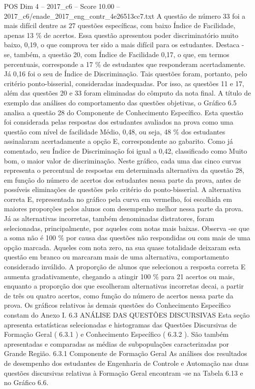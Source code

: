 \begin{textsample}{POS Dim 4 – 2017\_c6 – Score 10.00 – 2017\_c6/enade\_2017\_eng\_contr\_4e26513cc7.txt}
A questão de número 33 foi a mais difícil dentre as 27 questões específicas, com baixo Índice de Facilidade, apenas 13 \% de acertos.
Essa questão apresentou poder discriminatório muito baixo, 0,19, o que comprova ter sido a mais difícil para os estudantes.
Destaca -se, também, a questão 20, com Índice de Facilidade 0,17, o que, em termos percentuais, corresponde a 17 \% de estudantes que responderam acertadamente.
Já 0,16 foi o seu de Índice de Discriminação.
Tais questões foram, portanto, pelo critério ponto-bisserial, consideradas inadequadas.
Por isso, as questões 11 e 17, além das questões 20 e 33 foram eliminadas do cômputo da nota final.
A título de exemplo das análises do comportamento das questões objetivas, o Gráfico 6.5 analisa a questão 28 do Componente de Conhecimento Específico.
Esta questão foi considerada pelas respostas dos estudantes avaliados na prova como uma questão com nível de facilidade Médio, 0,48, ou seja, 48 \% dos estudantes assinalaram acertadamente a opção E, correspondente ao gabarito.
Como já comentado, seu Índice de Discriminação foi igual a 0,42, classificado como Muito bom, o maior valor de discriminação.
Neste gráfico, cada uma das cinco curvas representa o percentual de respostas em determinada alternativa da questão 28, em função do número de acertos dos estudantes nessa parte da prova, antes de possíveis eliminações de questões pelo critério do ponto-bisserial.
A alternativa correta E, representada no gráfico pela curva em vermelho, foi escolhida em maiores proporções pelos alunos com desempenho melhor nessa parte da prova.
Já as alternativas incorretas, também denominadas distratores, foram selecionadas, principalmente, por aqueles com notas mais baixas.
Observa -se que a soma não é 100 \% por causa das questões não respondidas ou com mais de uma opção marcada.
Aqueles com nota zero, na sua quase totalidade deixaram esta questão em branco ou marcaram mais de uma alternativa, comportamento considerado inválido.
A proporção de alunos que selecionou a resposta correta E aumenta gradativamente, chegando a atingir 100 \% para 21 acertos ou mais, enquanto a proporção dos que escolheram alternativas incorretas decai, a partir de três ou quatro acertos, como função do número de acertos nessa parte da prova.
Os gráficos relativos às demais questões do Conhecimento Específico constam do Anexo I. 6.3 ANÁLISE DAS QUESTÕES DISCURSIVAS Esta seção apresenta estatísticas selecionadas e histogramas das Questões Discursivas de Formação Geral ( 6.3.1 ) e Conhecimento Específico ( 6.3.2 ).
São também apresentadas e comparadas as médias de subpopulações caracterizadas por Grande Região. 6.3.1 Componente de Formação Geral As análises dos resultados de desempenho dos estudantes de Engenharia de Controle e Automação nas duas questões discursivas relativas à Formação Geral encontram -se na Tabela 6.13 e no Gráfico 6.6.

\end{textsample}
